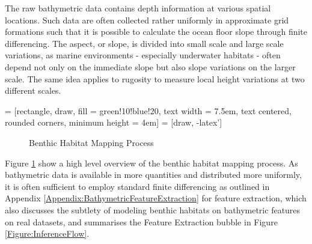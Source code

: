 		The raw bathymetric data contains depth information at various spatial locations. Such data are often collected rather uniformly in approximate grid formations such that it is possible to calculate the ocean floor slope through finite differencing. The aspect, or slope, is divided into small scale and large scale variations, as marine environments - especially underwater habitats - often depend not only on the immediate slope but also slope variations on the larger scale. The same idea applies to rugosity to measure local height variations at two different scales.
		
		 = [rectangle, draw, fill = green!10!blue!20, text width = 7.5em, text centered, rounded corners, minimum height = 4em]
		 = [draw, -latex']
	
		\begin{figure}[!ht]
		\centering{}		
		\caption{Benthic Habitat Mapping Process}
		\label{Figure:BenthicHabitatMappingProcess}
		\end{figure}
		
		Figure \ref{Figure:BenthicHabitatMappingProcess} show a high level overview of the benthic habitat mapping process. As bathymetric data is available in more quantities and distributed more uniformly, it is often sufficient to employ standard finite differencing as outlined in Appendix \ref{Appendix:BathymetricFeatureExtraction} for feature extraction, which also discusses the subtlety of modeling benthic habitats on bathymetric features on real datasets, and summarises the Feature Extraction bubble in Figure \ref{Figure:InferenceFlow}.
				
